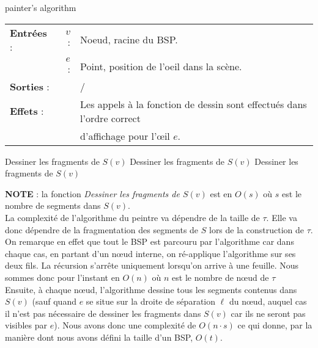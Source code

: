 \documentclass[11pts]{article}
\begin{document}
\begin{algorithm}[H]
\caption{painter's algorithm}
\begin{tabular}{lrl}
\textbf{Entrées} : &$v$ : &Noeud, racine du BSP.\\
&$e$ :&Point, position de l'oeil dans la scène.\\[.25cm]
\textbf{Sorties} :& &/\\[.25cm]
\textbf{Effets} :& &Les appels à la fonction de dessin sont effectués dans l'ordre correct\\
& & d'affichage pour l'œil $e$.\\[.25cm]
\end{tabular}
\begin{algorithmic}[1]
	\State Dessiner les fragments de $S(v)$
\Else
		\State {}
		\State Dessiner les fragments de $S(v)$
		\State {}
		\State {}
		\State Dessiner les fragments de $S(v)$
		\State {}
	\Else
		\State {}
		\State {}
	\EndIf
\EndIf
\EndProcedure
\end{algorithmic}
\end{algorithm}
\noindent\textbf{NOTE} : la fonction \emph{Dessiner les fragments de $S(v)$} est en $O(s)$ où $s$ est le nombre de segments dans $S(v)$.\\[1cm]
La complexité de l'algorithme du peintre va dépendre de la taille de $\tau$. Elle va donc dépendre de la fragmentation des segments de $S$ lors de la construction de $\tau$.\\
On remarque en effet que tout le BSP est parcouru par l'algorithme car dans chaque cas, en partant d'un nœud interne, on ré-applique l'algorithme sur ses deux fils. La récursion s'arrête uniquement lorsqu'on arrive à une feuille. Nous sommes donc pour l'instant en $O(n)$ où $n$ est le nombre de nœud de $\tau$\\[.2cm]
Ensuite, à chaque nœud, l'algorithme dessine tous les segments contenus dans $S(v)$ (sauf quand $e$ se situe sur la droite de séparation $\ell$ du nœud, auquel cas il n'est pas nécessaire de dessiner les fragments dans $S(v)$ car ils ne seront pas visibles par $e$). Nous avons donc une complexité de $O(n\cdot s)$ ce qui donne, par la manière dont nous avons défini la taille d'un BSP, $O(t)$.
\end{document}
